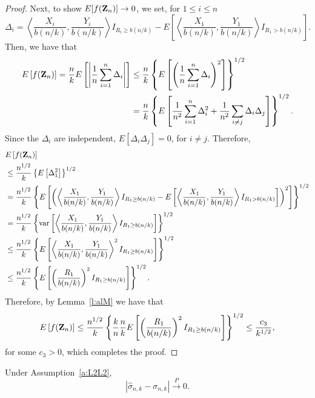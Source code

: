 \documentclass[lineno]{biometrika}
\newcommand \sg{\sigma}
\newcommand\bZ{{\bf Z}}
\newcommand\lp{\left (}
\newcommand\rp{\right )}
\newcommand\lb{\left [}
\newcommand\rb{\right ]}
\newcommand\lmo{\left |}
\newcommand\rmo{\right |}
\newcommand\lbr{\left \{}
\newcommand\rbr{\right \}}
\newcommand\lip{\left \langle}
\newcommand\rip{\right \rangle}
\def\convP{\stackrel{\mbox{$\scriptstyle P$}}{\rightarrow}}
\newcommand\var{\hbox{\rm var}}
\begin{document}
\begin{proof}
Next, to show $E[f(\bZ_n)] \to 0$, we set, for $1 \le i \le n$
\[
\Delta_i =  \lip \frac{X_i}{b(n/k)}, \frac{Y_i}{b(n/k)} \rip I_{R_i \ge b(n/k) }- E\lb \lip \frac{X_1}{b(n/k)}, \frac{Y_1}{b(n/k)} \rip I_{R_1 >b(n/k)}\rb.
\]
Then, we have that
\begin{align*}
E \lb f(\bZ_n) \rb = \frac{n}{k} E \lb \lmo \frac{1}{n} \sum_{i=1}^n \Delta_i \rmo \rb &\le \frac{n}{k} \lbr E \lb \lp \frac{1}{n} \sum_{i=1}^n \Delta_i \rp^2 \rb \rbr^{1/2}\\
&= \frac{n}{k} \lbr E \lb   \frac{1}{n^2} \sum_{i=1}^n \Delta_i^2 + \frac{1}{n^2} \sum_{i \neq j} \Delta_i\Delta_j \rb \rbr^{1/2}.
\end{align*}
Since the $\Delta_i$ are independent, $E[\Delta_i\Delta_j]=0$, for $i \neq j$. Therefore,
\begin{align*}
&E \lb f(\bZ_n) \rb \\
&\le \frac{n^{1/2}}{k} \lbr E \lb    \Delta_1^2  \rb \rbr^{1/2} \\
&= \frac{n^{1/2}}{k} \lbr  E  \lb \lp \lip \frac{X_1}{b(n/k)}, \frac{Y_1}{b(n/k)} \rip I_{R_1 \ge b(n/k) } - E\lb \lip \frac{X_1}{b(n/k)}, \frac{Y_1}{b(n/k)} \rip I_{R_1 >b(n/k)}\rb  \rp^2\rb \rbr^{1/2}\\
& = \frac{n^{1/2}}{k} \lbr  \var \lb  \lip \frac{X_1}{b(n/k)}, \frac{Y_1}{b(n/k)} \rip I_{R_1 \ge b(n/k) } \rb \rbr^{1/2} \\
& \le \frac{n^{1/2}}{k} \lbr  E  \lb \lip \frac{X_1}{b(n/k)}, \frac{Y_1}{b(n/k)} \rip^2 I_{R_1 \ge b(n/k) } \rb \rbr^{1/2}\\
& \le  \frac{n^{1/2}}{k}  \lbr E \lb  \lp \frac{R_1}{b(n/k)} \rp^2  I_{R_1 \ge b(n/k) }  \rb \rbr^{1/2}.
\end{align*}
Therefore, by Lemma~\ref{l:alM} we have that
\[
E \lb f(\bZ_n) \rb \le \frac{n^{1/2}}{k}  \lbr  \frac{k}{n} \frac{n}{k} E \lb  \lp \frac{R_1}{b(n/k)} \rp^2  I_{R_1 \ge b(n/k) }  \rb \rbr^{1/2} \le \frac{c_3}{k^{1/2}},
\]
for some $c_3>0$, which completes the proof.
\end{proof}

\begin{proposition} \label{p:hat}
Under Assumption~\ref{a:L2L2},
\[
|\hat{\sg}_{n,k} - \sg_{n,k} | \convP 0.
\]
\end{proposition}
\end{document}
